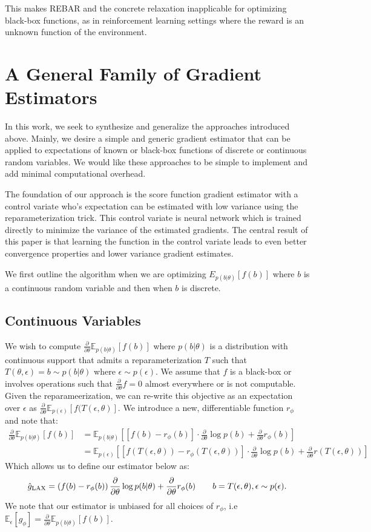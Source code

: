 \documentclass{article}
\newcommand{\E}{\mathbb{E}}
\newcommand{\PT}{\frac{\partial}{\partial \theta}}
\newcommand{\LP}[1]{\PT \log p(#1)}
\newcommand{\LAX}{{\textnormal{LAX}}}
\begin{document}
This makes REBAR and the concrete relaxation inapplicable for optimizing black-box functions, as in reinforcement learning settings where the reward is an unknown function of the environment.


\section{A General Family of Gradient Estimators}
In this work, we seek to synthesize and generalize the approaches introduced above. Mainly, we desire a simple and generic gradient estimator that can be applied to expectations of known or black-box functions of discrete or continuous random variables. We would like these approaches to be simple to implement and add minimal computational overhead. 

The foundation of our approach is the score function gradient estimator with a control variate who's expectation can be estimated with low variance using the reparameterization trick. This control variate is neural network which is trained directly to minimize the variance of the estimated gradients. The central result of this paper is that learning the function in the control variate leads to even better convergence properties and lower variance gradient estimates. 

We first outline the algorithm when we are optimizing $E_{p(b|\theta)}[f(b)]$ where $b$ is a continuous random variable and then when $b$ is discrete.

\subsection{Continuous Variables}
We wish to compute $\PT\E_{p(b|\theta)}[f(b)]$ where $p(b|\theta)$ is a distribution with continuous support that admits a reparameterization $T$ such that $T(\theta, \epsilon) = b \sim p(b|\theta)$ where $\epsilon \sim p(\epsilon)$. We assume that $f$ is a black-box or involves operations such that $\PT f = 0$ almost everywhere or is not computable.  Given the reparameerization, we can re-write this objective as an expectation over $\epsilon$ as  $\PT\E_{p(\epsilon)}[f(T(\epsilon, \theta)]$. We introduce a new, differentiable function $r_\phi$ and note that:
%
\begin{align}
\PT\E_{p(b|\theta)}[f(b)] &= \E_{p(b|\theta)}\left[ \left[f(b) - r_\phi(b)\right]\cdot\LP{b} + \PT r_\phi(b) \right]\nonumber\\
&= \E_{p(\epsilon)} \left[ \left[f(T(\epsilon, \theta)) - r_\phi(T(\epsilon, \theta))\right]\cdot\LP{b} + \PT r(T(\epsilon, \theta))\right]\nonumber
\end{align}
%
Which allows us to define our estimator below as: 
%
\begin{align}
\label{eq:cont_est}
\hat g_\LAX = \left(f(b) -r_\phi(b)\right)\PT \log p(b|\theta) + \PT r_\phi(b) \qquad b = T(\epsilon, \theta), \epsilon \sim p(\epsilon).
\end{align}
%
We note that our estimator is unbiased for all choices of $r_\phi$, i.e $\E_\epsilon[g_\phi] = \PT\E_{p(b|\theta)}[f(b)]$. 
\end{document}
